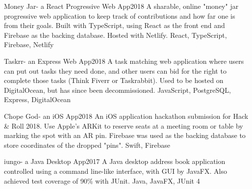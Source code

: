 %
%
%


\begin{projects}
	\project
	{Money Jar}{- a React Progressive Web App}{2018}
	{  }
	{A sharable, online "money" jar progressive web application to keep track of contributions and how far one is from their goals. Built with TypeScript, using React as the front end and Firebase as the backing database. Hosted with Netlify.}
	{React, TypeScript, Firebase, Netlify}

	\project
	{Taskrr}{- an Express Web App}{2018}
	{}
	{A task matching web application where users can put out tasks they need done, and other users can bid for the right to complete those tasks (Think Fiverr or Taskrabbit). Used to be hosted on DigitalOcean, but has since been decommissioned.}
	{JavaScript, PostgreSQL, Express, DigitalOcean}

	\project
	{Chope God}{- an iOS App}{2018}
	{}
	{An iOS application hackathon submission for Hack \& Roll 2018. Use Apple’s ARKit to reserve seats at a meeting room or table by marking the spot with an AR pin.  Firebase was used as the backing database to store coordinates of the dropped "pins".}
	{Swift, Firebase}

	\project
	{iungo}{- a Java Desktop App}{2017}
	{}
	{A Java desktop address book application controlled using a command line-like interface, with GUI by JavaFX. Also achieved test coverage of 90\% with JUnit.}
	{Java, JavaFX, JUnit 4}

\end{projects}
